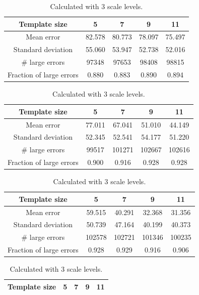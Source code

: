\documentclass[12pt,a4paper,oneside,final]{article}
\begin{document}
\begin{table}[H]
\begin{subtable}{1\textwidth}
	\begin{table}[H]
		\centering
		\begin{subtable}{1\textwidth}
			\centering
			\begin{tabular}{c||c|c|c|c}
				Template size &5&7&9&11\\\hline
				Mean error &82.578&80.773&78.097&75.497\\\hline
				Standard deviation &55.060&53.947&52.738&52.016\\\hline
				\# large errors &97348&97653&98408&98815\\\hline
				Fraction of large errors &0.880&0.883&0.890&0.894\\\hline
			\end{tabular}
			\caption{Calculated with 1 scale level.}
		\end{subtable}
		\begin{subtable}{1\textwidth}
			\centering
			\begin{tabular}{c||c|c|c|c}
				Template size &5&7&9&11\\\hline
				Mean error &77.011&67.041&51.010&44.149\\\hline
				Standard deviation &52.345&52.541&54.177&51.220\\\hline
				\# large errors &99517&101271&102667&102616\\\hline
				Fraction of large errors &0.900&0.916&0.928&0.928\\\hline
			\end{tabular}
			\caption{Calculated with 2 scale levels.}
		\end{subtable}
		\begin{subtable}{1\textwidth}
			\centering
			\begin{tabular}{c||c|c|c|c}
				Template size &5&7&9&11\\\hline
				Mean error &59.515&40.291&32.368&31.356\\\hline
				Standard deviation &50.739&47.164&40.199&40.373\\\hline
				\# large errors &102578&102721&101346&100235\\\hline
				Fraction of large errors &0.928&0.929&0.916&0.906\\\hline
			\end{tabular}
			\caption{Calculated with 3 scale levels.}
		\end{subtable}
		\begin{subtable}{1\textwidth}
			\centering
			\begin{tabular}{c||c|c|c|c}
				Template size &5&7&9&11\\\hline

\end{tabular}
\end{subtable}
\end{table}
\end{subtable}
\end{table}
\end{document}

